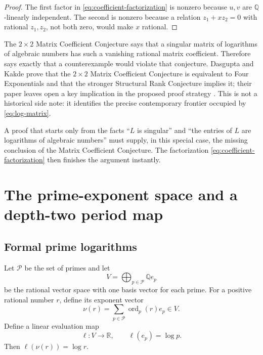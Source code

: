 \documentclass[11pt]{article}
\theoremstyle{definition}
\theoremstyle{remark}
\newcommand{\Q}{\mathbb{Q}}
\newcommand{\R}{\mathbb{R}}
\newcommand{\ord}{\operatorname{ord}}
\newcommand{\ellmap}{\boldsymbol{\ell}}
\begin{document}
\begin{proof}
The first factor in \eqref{eq:coefficient-factorization} is nonzero because $u,v$ are
$\Q$-linearly independent.  The second is nonzero because a relation
$z_1+xz_2=0$ with rational $z_1,z_2$, not both zero, would make $x$ rational.
\end{proof}

The $2\times2$ Matrix Coefficient Conjecture says that a singular matrix of logarithms of
algebraic numbers has such a vanishing rational matrix coefficient.  Therefore
 says exactly that a counterexample would violate that conjecture.
Dasgupta and Kakde prove that the $2\times2$ Matrix Coefficient Conjecture is equivalent to
Four Exponentials and that the stronger Structural Rank Conjecture implies it; their paper
leaves open a key implication in the proposed proof strategy \cite{DK2026}.  This is not a
historical side note: it identifies the precise contemporary frontier occupied by
\eqref{eq:log-matrix}.

\begin{frontierbox}
A proof that starts only from the facts ``$L$ is singular'' and ``the entries of $L$ are
logarithms of algebraic numbers'' must supply, in this special case, the missing conclusion
of the Matrix Coefficient Conjecture.  The factorization
\eqref{eq:coefficient-factorization} then finishes the argument instantly.
\end{frontierbox}

\section{The prime-exponent space and a depth-two period map}
\label{sec:depth-two}

\subsection{Formal prime logarithms}

Let $\mathcal P$ be the set of primes and let
\[
 V=\bigoplus_{p\in\mathcal P}\Q e_p
\]
be the rational vector space with one basis vector for each prime.  For a positive rational
number $r$, define its exponent vector
\[
 \nu(r)=\sum_{p\in\mathcal P}\ord_p(r)e_p\in V.
\]
Define a linear evaluation map
\begin{equation}
 \ellmap:V\longrightarrow\R,
 \qquad
 \ellmap(e_p)=\log p.
 \label{eq:ell-map}
\end{equation}
Then $\ellmap(\nu(r))=\log r$.
\end{document}
